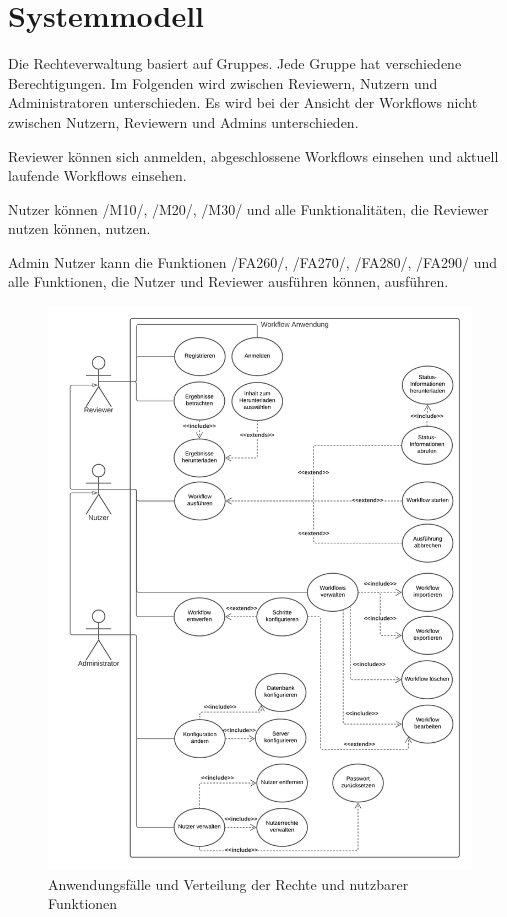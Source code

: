 \chapter{Systemmodell}
Die Rechteverwaltung basiert auf \glspl{Gruppe}. Jede Gruppe hat verschiedene Berechtigungen. Im Folgenden wird zwischen Reviewern, Nutzern und Administratoren unterschieden. 
Es wird bei der Ansicht der Workflows nicht zwischen Nutzern, Reviewern und Admins unterschieden. 

Reviewer können sich anmelden, abgeschlossene Workflows einsehen und aktuell laufende Workflows einsehen.

Nutzer können /M10/, /M20/, /M30/ und alle Funktionalitäten, die Reviewer nutzen können, nutzen.

Admin Nutzer kann die Funktionen /FA260/, /FA270/, /FA280/, /FA290/ und alle Funktionen, die Nutzer und Reviewer ausführen können, ausführen.


\begin{figure}[ht]
    \centering
    \includegraphics[width = \textwidth]{Grafiken/Diagramme/Anwendungsfalldiagramm.png}
    \caption{Anwendungsfälle und Verteilung der Rechte und nutzbarer Funktionen}
    \label{fig:Abb 1}
\end{figure}